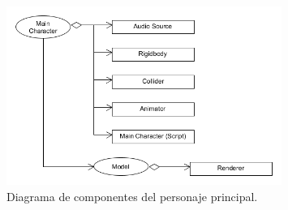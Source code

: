 \begin{figure}[h]
	\includegraphics[width=0.8\textwidth]{images/estructura/objetos/main_character}
	\centering
	\caption{Diagrama de componentes del personaje principal.}
\end{figure}

